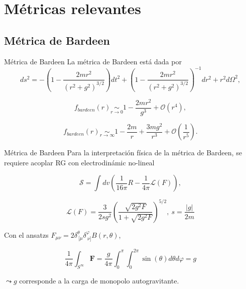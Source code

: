 \documentclass[t]{beamer}
\numberwithin{equation}{section}
\begin{document}
\section{\label{previous metrics section} Métricas relevantes}


\subsection{\label{bardeen section} Métrica de Bardeen}
\begin{frame}{Métrica de Bardeen}
\vspace{\fill}
La métrica de Bardeen está dada por \cite{bardeen}
\small
\begin{equation}
\label{bardeen metric}
ds^2 = -\left( 1 - \frac{2mr^2}{(r^2 + g^2)^{3/2}} \right)dt^2 + \left( 1 - \frac{2mr^2}{(r^2 + g^2)^{3/2}} \right)^{-1}dr^2 + r^2d\Omega^2,
\end{equation}

\normalsize
\begin{equation}
f_{bardeen}(r) \underset{r \to 0}{\sim} 1 - \frac{2mr^2}{g^3} + \mathcal{O}(r^4),
\end{equation}

\begin{equation}
f_{bardeen}(r) \underset{r \to \infty}{\sim} 1 - \frac{2m}{r} + \frac{3mg^2}{r^3} + \mathcal{O}\left( \frac{1}{r^5} \right).
\end{equation}
\vspace{\fill}
\end{frame}

\begin{frame}{Métrica de Bardeen}
Para la interpretación física de la métrica de Bardeen, se requiere acoplar RG con electrodinámic no-lineal \cite{ayon-beato2000}

\begin{equation}
\mathcal{S} = \int dv \left( \frac{1}{16 \pi}R - \frac{1}{4 \pi}\mathcal{L}(F) \right),
\end{equation}

\begin{equation}
\label{nonlinear bardeen}
\mathcal{L}(F) = \frac{3}{2sg^2}\left( \frac{\sqrt{2g^2F}}{1 + \sqrt{2g^2F}} \right)^{5/2},\ s = \frac{|g|}{2m}
\end{equation}

Con el ansatzs $F_{\mu \nu} = 2 \delta^{\theta}_{\ \lbrack\mu} \delta^{\varphi}_{\ \nu\rbrack} B(r, \theta)
$,

\begin{equation*}
\frac{1}{4 \pi} \int_{S^{\infty}}\mathbf{F} = \frac{g}{4 \pi} \int_{0}^{\pi}\int_{0}^{2\pi}\sin (\theta) d\theta d\varphi = g
\end{equation*}

$ \leadsto g$ corresponde a la carga de monopolo autogravitante.
\end{frame}
\end{document}

